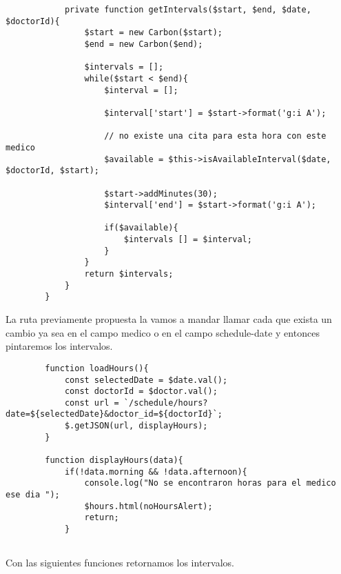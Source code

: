 \documentclass[a4paper]{article}
\begin{document}
\begin{lstlisting}
			private function getIntervals($start, $end, $date, $doctorId){
				$start = new Carbon($start);
				$end = new Carbon($end);
				
				$intervals = [];
				while($start < $end){
					$interval = [];
					
					$interval['start'] = $start->format('g:i A');
					
					// no existe una cita para esta hora con este medico
					$available = $this->isAvailableInterval($date, $doctorId, $start);
					
					$start->addMinutes(30);
					$interval['end'] = $start->format('g:i A');
					
					if($available){
						$intervals [] = $interval;
					}
				}
				return $intervals;
			}
		}
	\end{lstlisting}
	
	
	La ruta previamente propuesta la vamos a mandar llamar cada que exista un cambio ya sea en el campo medico o en el campo schedule-date y entonces pintaremos los intervalos.
	
	\begin{lstlisting}
		function loadHours(){
			const selectedDate = $date.val();
			const doctorId = $doctor.val();
			const url = `/schedule/hours?date=${selectedDate}&doctor_id=${doctorId}`;
			$.getJSON(url, displayHours);
		}
		
		function displayHours(data){
			if(!data.morning && !data.afternoon){
				console.log("No se encontraron horas para el medico ese dia ");
				$hours.html(noHoursAlert);
				return;
			}
	
	\end{lstlisting}

	Con las siguientes funciones retornamos los intervalos.
	
\end{document}

